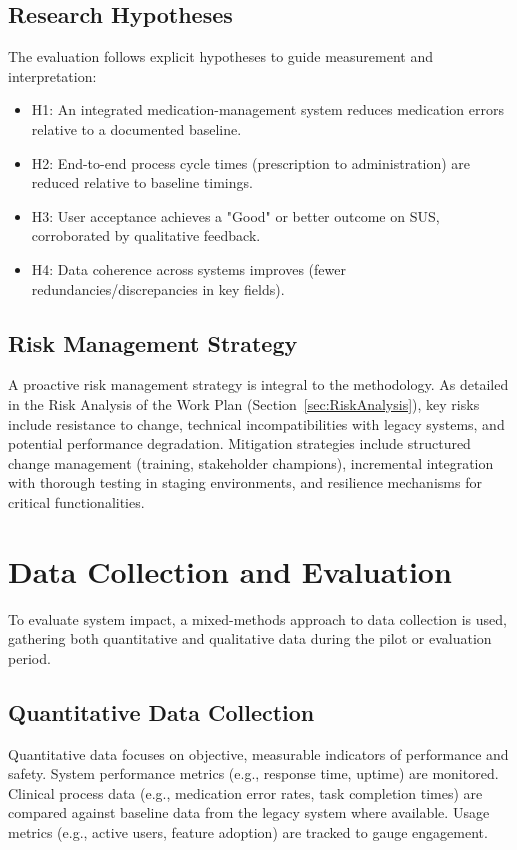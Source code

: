 \subsection{Research Hypotheses}
The evaluation follows explicit hypotheses to guide measurement and interpretation:
\begin{itemize}
    \item H1: An integrated medication-management system reduces medication errors relative to a documented baseline.
    \item H2: End-to-end process cycle times (prescription to administration) are reduced relative to baseline timings.
    \item H3: User acceptance achieves a "Good" or better outcome on SUS, corroborated by qualitative feedback.
    \item H4: Data coherence across systems improves (fewer redundancies/discrepancies in key fields).
\end{itemize}

\subsection{Risk Management Strategy}

A proactive risk management strategy is integral to the methodology. As detailed in the Risk Analysis of the Work Plan (Section~\ref{sec:RiskAnalysis}), key risks include resistance to change, technical incompatibilities with legacy systems, and potential performance degradation. Mitigation strategies include structured change management (training, stakeholder champions), incremental integration with thorough testing in staging environments, and resilience mechanisms for critical functionalities.

\section{Data Collection and Evaluation}

To evaluate system impact, a mixed-methods approach to data collection is used, gathering both quantitative and qualitative data during the pilot or evaluation period.

\subsection{Quantitative Data Collection}
Quantitative data focuses on objective, measurable indicators of performance and safety. System performance metrics (e.g., response time, uptime) are monitored. Clinical process data (e.g., medication error rates, task completion times) are compared against baseline data from the legacy system where available. Usage metrics (e.g., active users, feature adoption) are tracked to gauge engagement.


